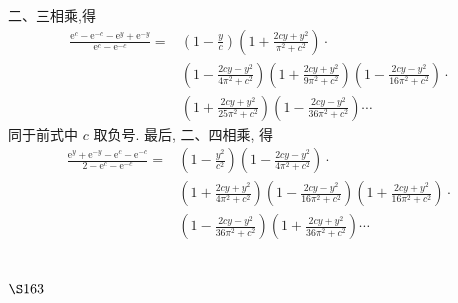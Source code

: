 二、三相乘,得
\[
\begin{aligned}
\frac{\mathrm{e}^{c}-\mathrm{e}^{-c}-\mathrm{e}^{y}+\mathrm{e}^{-y}}{\mathrm{e}^{c}-\mathrm{e}^{-c}}= & \left(1-\frac{y}{c}\right)\left(1+\frac{2 c y+y^{2}}{\pi^{2}+c^{2}}\right) \cdot \\
& \left(1-\frac{2 c y-y^{2}}{4 \pi^{2}+c^{2}}\right)\left(1+\frac{2 c y+y^{2}}{9 \pi^{2}+c^{2}}\right)\left(1-\frac{2 c y-y^{2}}{16 \pi^{2}+c^{2}}\right) \cdot \\
& \left(1+\frac{2 c y+y^{2}}{25 \pi^{2}+c^{2}}\right)\left(1-\frac{2 c y-y^{2}}{36 \pi^{2}+c^{2}}\right) \cdots
\end{aligned}
\]
同于前式中 $c$ 取负号. 最后, 二、四相乘, 得
\[
\begin{aligned}
\frac{\mathrm{e}^{y}+\mathrm{e}^{-y}-\mathrm{e}^{c}-\mathrm{e}^{-c}}{2-\mathrm{e}^{c}-\mathrm{e}^{-c}}= & \left(1-\frac{y^{2}}{c^{2}}\right)\left(1-\frac{2 c y-y^{2}}{4 \pi^{2}+c^{2}}\right) \cdot \\
& \left(1+\frac{2 c y+y^{2}}{4 \pi^{2}+c^{2}}\right)\left(1-\frac{2 c y-y^{2}}{16 \pi^{2}+c^{2}}\right)\left(1+\frac{2 c y+y^{2}}{16 \pi^{2}+c^{2}}\right) \cdot \\
& \left(1-\frac{2 c y-y^{2}}{36 \pi^{2}+c^{2}}\right)\left(1+\frac{2 c y+y^{2}}{36 \pi^{2}+c^{2}}\right) \cdots
\end{aligned}
\]
\section{$\S 163$}

